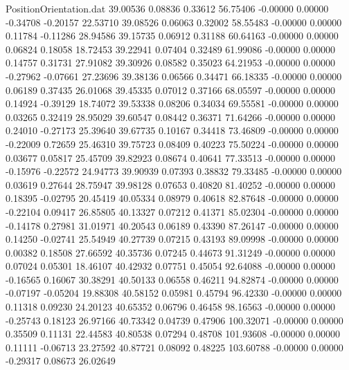 \begin{filecontents}{PositionOrientation.dat}
  39.00536    0.08836    0.33612    56.75406   -0.00000    0.00000   -0.34708   -0.20157   22.53710
  39.08526    0.06063    0.32002    58.55483   -0.00000    0.00000    0.11784   -0.11286   28.94586
  39.15735    0.06912    0.31188    60.64163   -0.00000    0.00000    0.06824    0.18058   18.72453
  39.22941    0.07404    0.32489    61.99086   -0.00000    0.00000    0.14757    0.31731   27.91082
  39.30926    0.08582    0.35023    64.21953   -0.00000    0.00000   -0.27962   -0.07661   27.23696
  39.38136    0.06566    0.34471    66.18335   -0.00000    0.00000    0.06189    0.37435   26.01068
  39.45335    0.07012    0.37166    68.05597   -0.00000    0.00000    0.14924   -0.39129   18.74072
  39.53338    0.08206    0.34034    69.55581   -0.00000    0.00000    0.03265    0.32419   28.95029
  39.60547    0.08442    0.36371    71.64266   -0.00000    0.00000    0.24010   -0.27173   25.39640
  39.67735    0.10167    0.34418    73.46809   -0.00000    0.00000   -0.22009    0.72659   25.46310
  39.75723    0.08409    0.40223    75.50224   -0.00000    0.00000    0.03677    0.05817   25.45709
  39.82923    0.08674    0.40641    77.33513   -0.00000    0.00000   -0.15976   -0.22572   24.94773
  39.90939    0.07393    0.38832    79.33485   -0.00000    0.00000    0.03619    0.27644   28.75947
  39.98128    0.07653    0.40820    81.40252   -0.00000    0.00000    0.18395   -0.02795   20.45419
  40.05334    0.08979    0.40618    82.87648   -0.00000    0.00000   -0.22104    0.09417   26.85805
  40.13327    0.07212    0.41371    85.02304   -0.00000    0.00000   -0.14178    0.27981   31.01971
  40.20543    0.06189    0.43390    87.26147   -0.00000    0.00000    0.14250   -0.02741   25.54949
  40.27739    0.07215    0.43193    89.09998   -0.00000    0.00000    0.00382    0.18508   27.66592
  40.35736    0.07245    0.44673    91.31249   -0.00000    0.00000    0.07024    0.05301   18.46107
  40.42932    0.07751    0.45054    92.64088   -0.00000    0.00000   -0.16565    0.16067   30.38291
  40.50133    0.06558    0.46211    94.82874   -0.00000    0.00000   -0.07197   -0.05204   19.88308
  40.58152    0.05981    0.45794    96.42330   -0.00000    0.00000    0.11318    0.09230   24.20123
  40.65352    0.06796    0.46458    98.16563   -0.00000    0.00000   -0.25743    0.18123   26.97166
  40.73342    0.04739    0.47906   100.32071   -0.00000    0.00000    0.35509    0.11131   22.44583
  40.80538    0.07294    0.48708   101.93608   -0.00000    0.00000    0.11111   -0.06713   23.27592
  40.87721    0.08092    0.48225   103.60788   -0.00000    0.00000   -0.29317    0.08673   26.02649

\end{filecontents}
